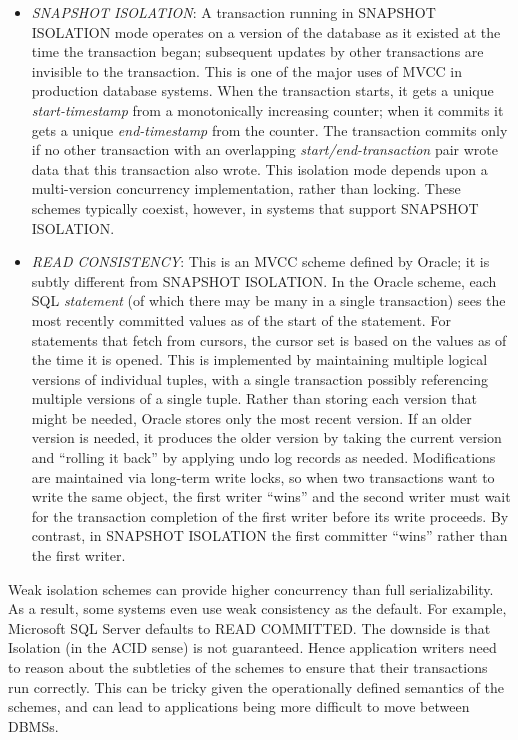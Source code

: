 \documentclass[b5paper,11pt,twoside,openright]{book}
\begin{document}
\begin{itemize}
\item
  \emph{SNAPSHOT ISOLATION}: A transaction running in SNAPSHOT
  ISOLATION mode operates on a version of the database as it existed at
  the time the transaction began; subsequent updates by other
  transactions are invisible to the transaction. This is one of the
  major uses of MVCC in production database systems. When the
  transaction starts, it gets a unique \emph{start-timestamp} from a
  monotonically increasing counter; when it commits it gets a unique
  \emph{end-timestamp} from the counter. The transaction commits only if
  no other transaction with an overlapping \emph{start/end-transaction}
  pair wrote data that this transaction also wrote. This isolation mode
  depends upon a multi-version concurrency implementation, rather than
  locking. These schemes typically coexist, however, in systems that
  support SNAPSHOT ISOLATION.
\item
  \emph{READ CONSISTENCY}: This is an MVCC scheme defined by Oracle; it
  is subtly different from SNAPSHOT ISOLATION. In the Oracle scheme,
  each SQL \emph{statement} (of which there may be many in a single
  transaction) sees the most recently committed values as of the start
  of the statement. For statements that fetch from cursors, the cursor
  set is based on the values as of the time it is opened. This is
  implemented by maintaining multiple logical versions of individual
  tuples, with a single transaction possibly referencing multiple
  versions of a single tuple. Rather than storing each version that
  might be needed, Oracle stores only the most recent version. If an
  older version is needed, it produces the older version by taking the
  current version and ``rolling it back'' by applying undo log records
  as needed. Modifications are maintained via long-term write locks, so
  when two transactions want to write the same object, the first writer
  ``wins'' and the second writer must wait for the transaction
  completion of the first writer before its write proceeds. By contrast,
  in SNAPSHOT ISOLATION the first committer ``wins'' rather than the
  first writer.
\end{itemize}

Weak isolation schemes can provide higher concurrency than full
serializability. As a result, some systems even use weak consistency as
the default. For example, Microsoft SQL Server defaults to READ
COMMITTED. The downside is that Isolation (in the ACID sense) is not
guaranteed. Hence application writers need to reason about the
subtleties of the schemes to ensure that their transactions run
correctly. This can be tricky given the operationally defined semantics
of the schemes, and can lead to applications being more difficult to
move between DBMSs.
\end{document}

